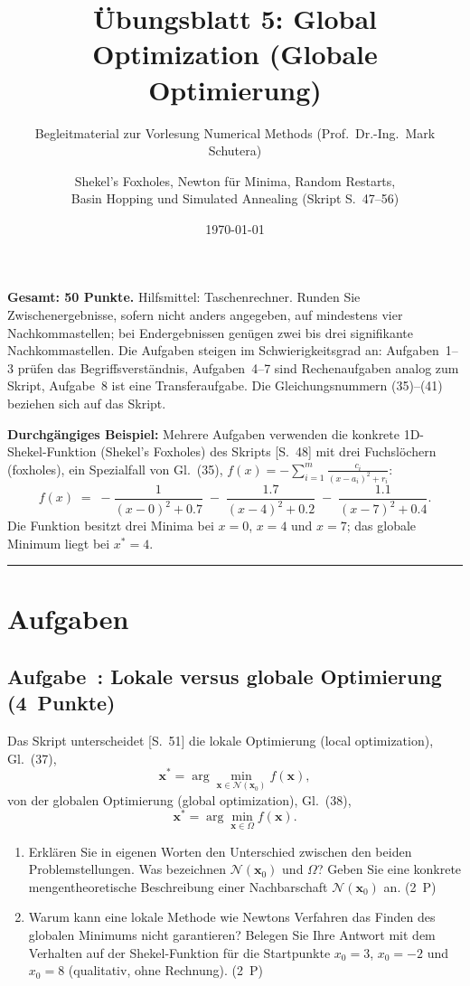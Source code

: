 \documentclass[a4paper,11pt]{scrartcl}
\title{Übungsblatt 5: Global Optimization (Globale Optimierung)}
\subtitle{Begleitmaterial zur Vorlesung \glqq Numerical Methods\grqq{} (Prof.\ Dr.-Ing.\ Mark Schutera)}
\author{Shekel's Foxholes, Newton für Minima, Random Restarts,\\ Basin Hopping und Simulated Annealing (Skript S.~47--56)}
\date{\today}
\newcounter{aufgabe}
\newcommand{\Aufgabe}[2]{%
  \refstepcounter{aufgabe}%
  \subsection*{Aufgabe~\theaufgabe: #1 \hfill (#2~Punkte)}%
  \label{auf:\theaufgabe}}
\begin{document}
\maketitle

\noindent\textbf{Gesamt: 50 Punkte.}\quad
Hilfsmittel: Taschenrechner. Runden Sie Zwischenergebnisse, sofern nicht anders angegeben, auf
mindestens vier Nachkommastellen; bei Endergebnissen genügen zwei bis drei signifikante
Nachkommastellen. Die Aufgaben steigen im Schwierigkeitsgrad an: Aufgaben~1--3 prüfen das
Begriffsverständnis, Aufgaben~4--7 sind Rechenaufgaben analog zum Skript, Aufgabe~8 ist eine
Transferaufgabe. Die Gleichungsnummern (35)--(41) beziehen sich auf das Skript.

\medskip
\noindent\textbf{Durchgängiges Beispiel:} Mehrere Aufgaben verwenden die konkrete
1D-Shekel-Funktion (Shekel's Foxholes) des Skripts [S.~48] mit drei Fuchslöchern (foxholes),
ein Spezialfall von Gl.~(35), $f(x) = -\sum_{i=1}^{m} \frac{c_i}{(x-a_i)^2 + r_i}$:
\[
  f(x) \;=\; -\frac{1}{(x-0)^2 + 0.7} \;-\; \frac{1.7}{(x-4)^2 + 0.2} \;-\; \frac{1.1}{(x-7)^2 + 0.4}.
\]
Die Funktion besitzt drei Minima bei $x = 0$, $x = 4$ und $x = 7$; das globale Minimum
liegt bei $x^* = 4$.

\bigskip
\hrule

\section*{Aufgaben}

\Aufgabe{Lokale versus globale Optimierung}{4}

Das Skript unterscheidet [S.~51] die lokale Optimierung (local optimization), Gl.~(37),
\[
  \mathbf{x}^* = \arg\min_{\mathbf{x} \in \mathcal{N}(\mathbf{x}_0)} f(\mathbf{x}), \tag{37}
\]
von der globalen Optimierung (global optimization), Gl.~(38),
\[
  \mathbf{x}^* = \arg\min_{\mathbf{x} \in \Omega} f(\mathbf{x}). \tag{38}
\]

\begin{enumerate}[label=(\alph*)]
  \item Erklären Sie in eigenen Worten den Unterschied zwischen den beiden Problemstellungen.
        Was bezeichnen $\mathcal{N}(\mathbf{x}_0)$ und $\Omega$? Geben Sie eine konkrete
        mengentheoretische Beschreibung einer Nachbarschaft $\mathcal{N}(\mathbf{x}_0)$ an.
        \hfill (2~P)
  \item Warum kann eine lokale Methode wie Newtons Verfahren das Finden des globalen
        Minimums nicht garantieren? Belegen Sie Ihre Antwort mit dem Verhalten auf der
        Shekel-Funktion für die Startpunkte $x_0 = 3$, $x_0 = -2$ und $x_0 = 8$
        (qualitativ, ohne Rechnung). \hfill (2~P)
\end{enumerate}
\end{document}
